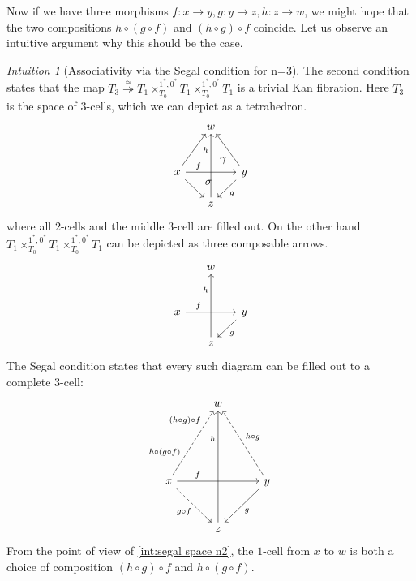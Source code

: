 \documentclass[11pt, a4paper]{amsart}
\theoremstyle{definition}
\theoremstyle{remark}
\newtheorem{intuition}[equation]{Intuition}
\numberwithin{equation}{section}
\begin{document}
Now if we have three morphisms $f\colon x \to y, g\colon y \to z, h\colon z \to w$, we might hope that the two compositions $h \circ (g \circ f)$ and $(h \circ g) \circ f$ coincide. Let us observe an intuitive argument why this should be the case.

\begin{intuition}[Associativity via the Segal condition for n=3] \label{int:segal space n3}
   The second condition states that the map $T_3 \overset{\simeq}{\twoheadrightarrow} T_1 \times^{1^*,0^*}_{T_0} T_1 \times^{1^*,0^*}_{T_0} T_1$ is a trivial Kan fibration. Here $T_3$ is the space of $3$-cells, which we can depict as a tetrahedron.
   \[
    \begin{tikzcd}[row sep=0.5cm, column sep=0.5cm]
     & w & \\
     & & \\
     x \arrow[uur] \arrow[dr] \arrow[rr, ""{name=U, above}, "f" near start] & & y \arrow[dl, "g"] \arrow[uul] \\
     & z \arrow[uuu, "h" near end]
     \arrow[start anchor={[xshift=-1ex, yshift=1ex]}, to=U, phantom, "\sigma"]
     \arrow[start anchor={[xshift=5ex, yshift=10ex]}, to=U, phantom, "\gamma"]
    \end{tikzcd}
   \]
   where all $2$-cells and the middle $3$-cell are filled out. 
   On the other hand $T_1 \times_{T_0}^{1^*,0^*} T_1 \times_{T_0}^{1^*,0^*} T_1$ can be depicted as three composable arrows.
   \[
    \begin{tikzcd}[row sep=0.5cm, column sep=0.5cm]
     & w & \\
     & & \\
     x \arrow[rr, ""{name=U, above}, "f" near start] & & y \arrow[dl, "g"] \\
     & z \arrow[uuu, "h" near end]
    \end{tikzcd}
   \]
   The Segal condition states that every such diagram can be filled out to a complete $3$-cell: 
   \[
    \begin{tikzcd}[row sep=1cm, column sep=1cm]
     & w & \\
     & & \\
     x \arrow[uur, dashed, "h \circ (g \circ f)" near start, "(h \circ g) \circ f" near end] 
     \arrow[dr, dashed, "g \circ f"'] \arrow[rr, ""{name=U, above}, "f" near start] & & 
     y \arrow[dl, "g"] \arrow[uul, dashed, "h \circ g"'] \\
     & z \arrow[uuu, "h" near end]
    \end{tikzcd}
   \]
   From the point of view of \cref{int:segal space n2}, the $1$-cell from $x$ to $w$ is both a choice of composition $(h \circ g) \circ f$ and $h \circ (g \circ f)$. 
\end{intuition}
   
\end{document}

